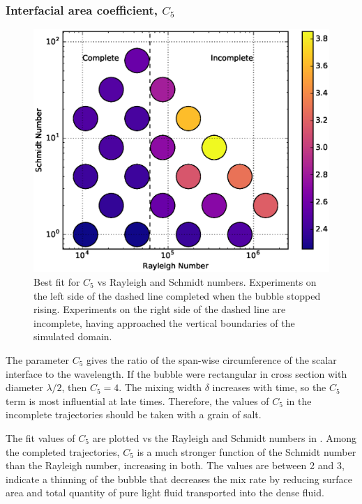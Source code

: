 \subsubsection{Interfacial area coefficient, $C_5$}
\begin{figure}
\includegraphics[width=\columnwidth]{figs/C5-vs-Rayleigh-Schmidt}
\caption{ 
  Best fit for $C_5$ vs Rayleigh and Schmidt numbers.
  Experiments on the left side of the dashed line completed when the bubble stopped rising.
  Experiments on the right side of the dashed line are incomplete, having approached the vertical boundaries of the simulated domain.
}
\end{figure}

The parameter $C_5$ gives the ratio of the span-wise circumference of the scalar interface to the wavelength.
If the bubble were rectangular in cross section with diameter $\lambda / 2$, then $C_5 = 4$.
The mixing width $\delta$ increases with time, so the $C_5$ term is most influential at late times.
Therefore, the values of $C_5$ in the incomplete trajectories should be taken with a grain of salt.

The fit values of $C_5$ are plotted vs the Rayleigh and Schmidt numbers in .
Among the completed trajectories, $C_5$ is a much stronger function of the Schmidt number than the Rayleigh number, increasing in both.
The values are between 2 and 3, indicate a thinning of the bubble that decreases the mix rate by reducing surface area and total quantity of pure light fluid transported into the dense fluid.

